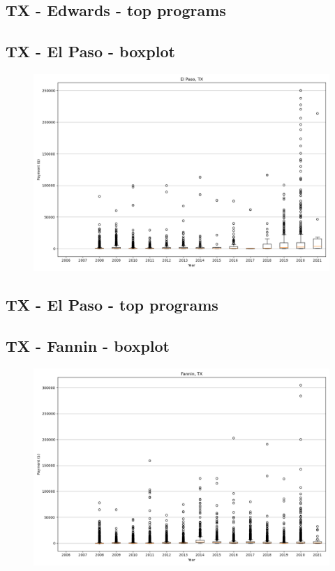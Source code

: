 \subsection*{TX - Edwards - top programs}

\newpage
\subsection*{TX - El Paso - boxplot}
\begin{figure}[h]
\centering
\includegraphics[width=7in]{../output/boxplots/counties/El Paso-TX_boxplot.png}
\end{figure}


\subsection*{TX - El Paso - top programs}

\newpage
\subsection*{TX - Fannin - boxplot}
\begin{figure}[h]
\centering
\includegraphics[width=7in]{../output/boxplots/counties/Fannin-TX_boxplot.png}
\end{figure}


